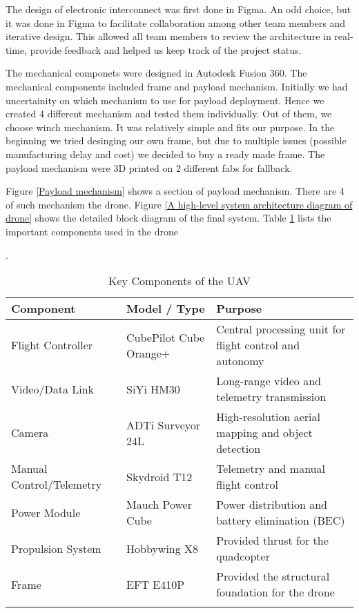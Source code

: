 \vspace*{12pt}
The design of electronic interconnect was first done in Figma.
An odd choice, but it was done in Figma to facilitate collaboration among other team members and iterative design.
This allowed all team members to review the architecture in real-time, provide feedback and helped us keep track of the project status.

\vspace*{12pt}
The mechanical componets were designed in Autodesk Fusion 360. The mechanical components included frame and payload mechanism.
Initially we had uncertainity on which mechanism to use for payload deployment.
Hence we created 4 different mechanism and tested them individually. Out of them, we choose winch mechanism.
It was relatively simple and fits our purpose.
In the beginning we tried desinging our own frame, but due to multiple issues (possible manufacturing delay and cost) we decided to buy a ready made frame.
The payload mechanism were 3D printed on 2 different fabs for fallback.

\vspace*{12pt}
Figure \ref{Payload mechanism} shows a section of payload mechanism. There are 4 of such mechanism the drone. 
Figure \ref{A high-level system architecture diagram of drone} shows the detailed block diagram of the final system.
Table \ref{comp} lists the important components used in the drone

. 

\begin{longtable}[h]{|l|l|p{5cm}|} \hline
	\textbf{Component}       & \textbf{Model / Type}  & \textbf{Purpose}                                        \\ \hline
	Flight Controller        & CubePilot Cube Orange+ & Central processing unit for flight control and autonomy \\ \hline
	Video/Data Link          & SiYi HM30              & Long-range video and telemetry transmission             \\ \hline
	Camera                   & ADTi Surveyor 24L      & High-resolution aerial mapping and object detection     \\ \hline
	Manual Control/Telemetry & Skydroid T12           & Telemetry and manual flight control                     \\ \hline
	Power Module             & Mauch Power Cube       & Power distribution and battery elimination (BEC)        \\ \hline
	Propulsion System        & Hobbywing X8           & Provided thrust for the quadcopter                      \\ \hline
	Frame                    & EFT E410P              & Provided the structural foundation for the drone        \\ \hline
	\caption{Key Components of the UAV}
	\label{comp}
\end{longtable}



